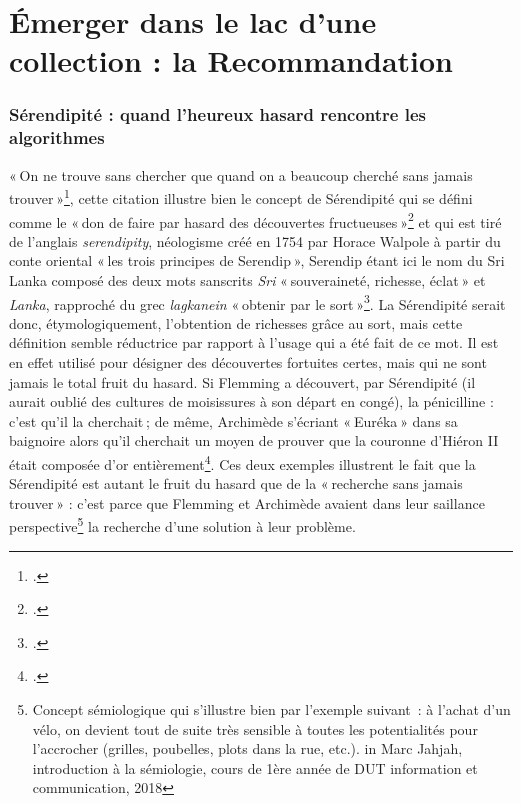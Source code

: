 \chapter{Émerger dans le lac d'une collection : la Recommandation}

\subsection{Sérendipité : quand l'heureux hasard rencontre les algorithmes}

« On ne trouve sans chercher que quand on a beaucoup cherché sans jamais trouver »\footcite{2015}, cette citation illustre bien le concept de Sérendipité qui se défini comme le « don de faire par hasard des découvertes fructueuses »\footcite{zotero-224} et qui est tiré de l’anglais \textit{serendipity}, néologisme créé en 1754 par Horace Walpole à partir du conte oriental « les trois principes de Serendip », Serendip étant ici le nom du Sri Lanka composé des deux mots sanscrits \textit{Sri} « souveraineté, richesse, éclat » et \textit{Lanka}, rapproché du grec \textit{lagkanein} « obtenir par le sort »\footcite{zotero-224}. La Sérendipité serait donc, étymologiquement, l’obtention de richesses grâce au sort, mais cette définition semble réductrice par rapport à l’usage qui a été fait de ce mot. Il est en effet utilisé pour désigner des découvertes fortuites certes, mais qui ne sont jamais le total fruit du hasard. Si Flemming a découvert, par Sérendipité (il aurait oublié des cultures de moisissures à son départ en congé), la pénicilline : c’est qu’il la cherchait ; de même, Archimède s’écriant « Euréka » dans sa baignoire alors qu’il cherchait un moyen de prouver que la couronne d’Hiéron II était composée d’or entièrement\footcite[Annexe 1]{michel2019}. Ces deux exemples illustrent le fait que la Sérendipité est autant le fruit du hasard que de la « recherche sans jamais trouver » : c’est parce que Flemming et Archimède avaient dans leur saillance perspective\footnote{Concept sémiologique qui s’illustre bien par l’exemple suivant : à l’achat d’un vélo, on devient tout de suite très sensible à toutes les potentialités pour l’accrocher (grilles, poubelles, plots dans la rue, etc.). in Marc Jahjah, introduction à la sémiologie, cours de 1ère année de DUT information et communication, 2018 } la recherche d’une solution à leur problème.

